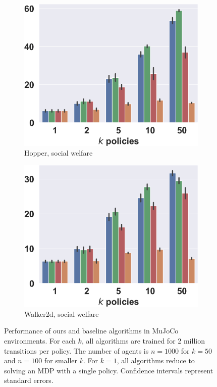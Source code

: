 \documentclass[letterpaper]{article} %
\begin{document}
\begin{figure}[t]
\begin{center}
\begin{subfigure}{0.245\textwidth}
    \end{subfigure}
    \hfill%
    \begin{subfigure}{0.245\textwidth}
        \centering
        \caption{Hopper, social welfare}
        \includegraphics[width=\linewidth]{pics/Hopper-v4_bars.png}
    \end{subfigure}%
    \hfill%
    \begin{subfigure}{0.245\textwidth}
        \centering
        \caption{Walker2d, social welfare}
        \includegraphics[width=\linewidth]{pics/Walker2d-v4_bars.png}
    \end{subfigure}

\caption{Performance of ours and baseline algorithms in MuJoCo environments. For each $k$, all algorithms are trained for 2 million transitions per policy. The number of agents is $n=1000$ for $k=50$ and $n=100$ for smaller $k$. For $k=1$, all algorithms reduce to solving an MDP with a single policy. Confidence intervals represent standard errors.}
\label{fig:results_mujoco}
\end{center}
\end{figure}
\end{document}
